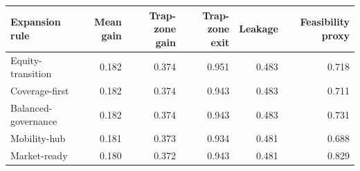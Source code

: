 \begin{tabular}{lrrrrr}
\toprule
Expansion rule & Mean gain & Trap-zone gain & Trap-zone exit & Leakage & Feasibility proxy \\
\midrule
Equity-transition & 0.182 & 0.374 & 0.951 & 0.483 & 0.718 \\
Coverage-first & 0.182 & 0.374 & 0.943 & 0.483 & 0.711 \\
Balanced-governance & 0.182 & 0.374 & 0.943 & 0.483 & 0.731 \\
Mobility-hub & 0.181 & 0.373 & 0.934 & 0.481 & 0.688 \\
Market-ready & 0.180 & 0.372 & 0.943 & 0.481 & 0.829 \\
\bottomrule
\end{tabular}

